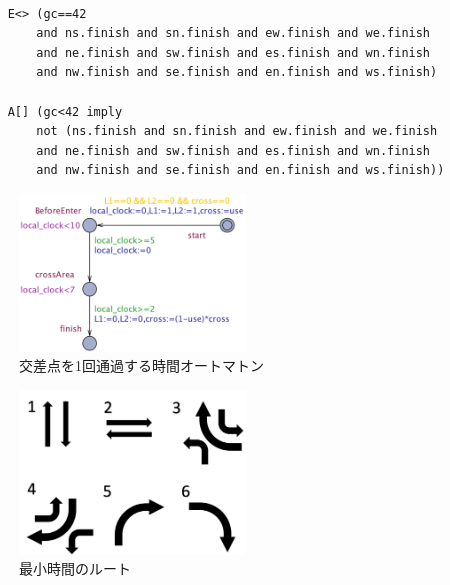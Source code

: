 \documentclass[twocolumn,10pt]{jsarticle}
\begin{document}
	
	\begin{verbatim}
	
	E<> (gc==42 
		and ns.finish and sn.finish and ew.finish and we.finish 
		and ne.finish and sw.finish and es.finish and wn.finish 
		and nw.finish and se.finish and en.finish and ws.finish)
	
	A[] (gc<42 imply 
		not (ns.finish and sn.finish and ew.finish and we.finish 
		and ne.finish and sw.finish and es.finish and wn.finish 
		and nw.finish and se.finish and en.finish and ws.finish))
	\end{verbatim}
	\begin{figure}[htbp]
	\centering
	\includegraphics[width=60mm]{minTime.png}
	\caption{交差点を1回通過する時間オートマトン}
	\label{minT}
	\end{figure}
	\begin{figure}[htbp]
	\centering
	\includegraphics[width=60mm]{veriT.png}
	\caption{最小時間のルート}
	\label{veriT}
	\end{figure}
\end{document}
